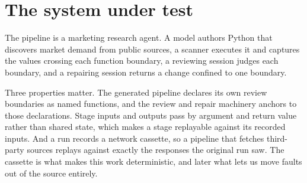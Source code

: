 \section{The system under test}

The pipeline is a marketing research agent. A model authors Python that discovers market
demand from public sources, a scanner executes it and captures the values crossing each
function boundary, a reviewing session judges each boundary, and a repairing session
returns a change confined to one boundary.

Three properties matter. The generated pipeline declares its own review boundaries as named
functions, and the review and repair machinery anchors to those declarations. Stage inputs
and outputs pass by argument and return value rather than shared state, which makes a stage
replayable against its recorded inputs. And a run records a network cassette, so a pipeline
that fetches third-party sources replays against exactly the responses the original run
saw. The cassette is what makes this work deterministic, and later what lets us move faults
out of the source entirely.
